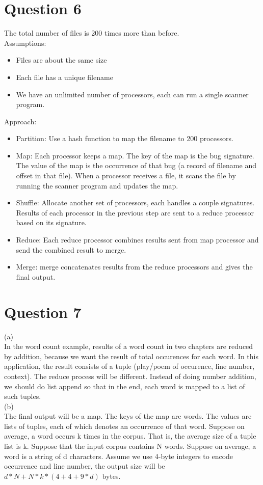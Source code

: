 \documentclass{article}
\begin{document}
\section{Question 6}
The total number of files is 200 times more than before.\\
Assumptions:
\begin{itemize}
    \item Files are about the same size
    \item Each file has a unique filename
    \item We have an unlimited number of processors, each can run a single scanner program.
\end{itemize}
Approach:
\begin{itemize}
    \item Partition: Use a hash function to map the filename to 200 processors.
    \item Map: Each processor keeps a map. The key of the map is the bug signature. The value of the map is the occurrence of that bug (a record of filename and offset in that file). When a processor receives a file, it scans the file by running the scanner program and updates the map.
    \item Shuffle: Allocate another set of processors, each handles a couple signatures. Results of each processor in the previous step are sent to a reduce processor based on its signature.
    \item Reduce: Each reduce processor combines results sent from map processor and send the combined result to merge.
    \item Merge: merge concatenates results from the reduce processors and gives the final output.
\end{itemize}


\section{Question 7}
(a)\\ In the word count example, results of a word count in two chapters are reduced by addition, because we want the result of total occurences for each word. In this application, the result consists of a tuple (play/poem of occurence, line number, context). The reduce process will be different. Instead of doing number addition, we should do list append so that in the end, each word is mapped to a list of such tuples.\\
(b)\\ The final output will be a map. The keys of the map are words. The values are lists of tuples, each of which denotes an occurrence of that word.
Suppose on average, a word occurs k times in the corpus. That is, the average size of a tuple list is k. Suppose that the input corpus contains N words. Suppose on average, a word is a string of d characters. Assume we use 4-byte integers to encode occurrence and line number, the output size will be $d * N + N * k * (4 + 4 + 9*d)$ bytes.
\end{document}
